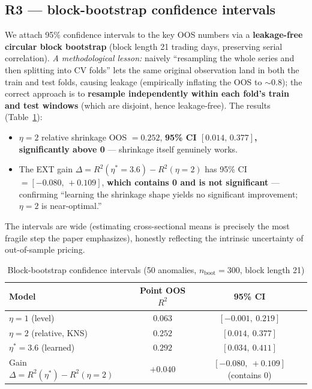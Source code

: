 \documentclass[11pt,a4paper]{article}
\newcommand{\Rtwo}{R^2}
\begin{document}
\subsection{R3 --- block-bootstrap confidence intervals}\label{sec:r3}
We attach 95\% confidence intervals to the key OOS numbers via a \textbf{leakage-free circular block bootstrap}
(block length 21 trading days, preserving serial correlation). \emph{A methodological lesson:} naively
``resampling the whole series and then splitting into CV folds'' lets the same original observation land in both
the train and test folds, causing leakage (empirically inflating the OOS to $\sim0.8$); the correct approach is to
\textbf{resample independently within each fold's train and test windows} (which are disjoint, hence leakage-free).
The results (Table~\ref{tab:boot}):
\begin{itemize}
  \item $\eta{=}2$ relative shrinkage OOS $=0.252$, \textbf{95\% CI $[0.014,\,0.377]$, significantly above 0} ---
  shrinkage itself genuinely works.
  \item The EXT gain $\Delta=\Rtwo(\eta^*{=}3.6)-\Rtwo(\eta{=}2)$ has 95\% CI $=[-0.080,\,+0.109]$, \textbf{which
  contains 0 and is not significant} --- confirming ``learning the shrinkage shape yields no significant
  improvement; $\eta{=}2$ is near-optimal.''
\end{itemize}
The intervals are wide (estimating cross-sectional means is precisely the most fragile step the paper emphasizes),
honestly reflecting the intrinsic uncertainty of out-of-sample pricing.

\begin{table}[H]\centering\small
\caption{Block-bootstrap confidence intervals (50 anomalies, $n_{\text{boot}}{=}300$, block length 21)}\label{tab:boot}
\begin{tabular}{lcc}
\toprule
Model & Point OOS $\Rtwo$ & 95\% CI \\
\midrule
$\eta{=}1$ (level) & $0.063$ & $[-0.001,\ 0.219]$ \\
$\eta{=}2$ (relative, KNS) & $0.252$ & $[0.014,\ 0.377]$ \\
$\eta^*{=}3.6$ (learned) & $0.292$ & $[0.034,\ 0.411]$ \\
\midrule
Gain $\Delta=\Rtwo(\eta^*)-\Rtwo(\eta{=}2)$ & $+0.040$ & $[-0.080,\ +0.109]$ (contains 0) \\
\bottomrule
\end{tabular}
\end{table}
\end{document}
